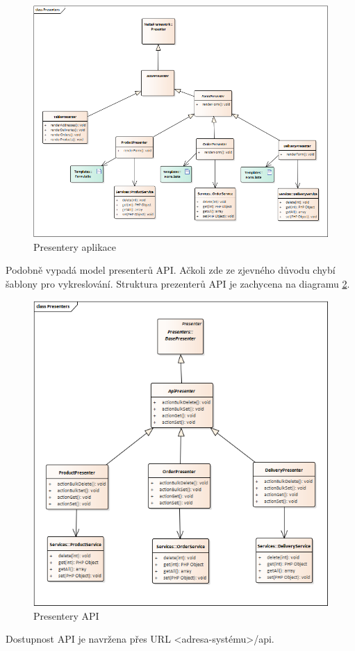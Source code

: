 \documentclass[thesis=B,czech]{FITthesis}[2012/06/26]
\begin{document}
\begin{figure}
	\includegraphics[width=\textwidth]{server_side_presenters.png}
	\caption{Presentery aplikace}\label{server_side_presenters}
\end{figure}	
	
	Podobně vypadá model presenterů API. Ačkoli zde ze zjevného důvodu chybí šablony pro vykreslování. Struktura prezenterů API je zachycena na diagramu \ref{api_presenters}.
\begin{figure}
	\includegraphics[width=\textwidth]{api_presenters.png}
	\caption{Presentery API}\label{api_presenters}
\end{figure}
	Dostupnost API je navržena přes URL <adresa-systému>/api.
\end{document}
